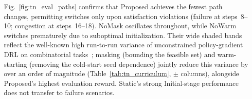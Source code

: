 \documentclass[12pt,lettersize,journal,onecolumn]{IEEEtran}
\begin{document}
Fig.~\ref{fig:tn_eval_paths} confirms that Proposed achieves the fewest path changes, permitting switches only upon satisfaction violations (failure at steps~8--10; congestion at steps~16--18). NoMask oscillates throughout, while NoWarm switches prematurely due to suboptimal initialization. Their wide shaded bands reflect the well-known high run-to-run variance of unconstrained policy-gradient DRL on combinatorial tasks~\cite{marl24albrecht}; masking (bounding the feasible set) and warm-starting (removing the cold-start seed dependence) jointly reduce this variance by over an order of magnitude (Table~\ref{tab:tn_curriculum}, $\pm$ columns), alongside Proposed's highest evaluation reward. Static's strong Initial-stage performance does not transfer to failure scenarios.
\end{document}
